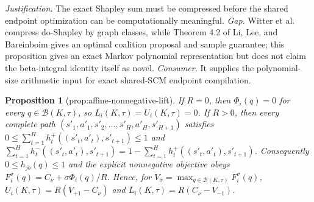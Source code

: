 \documentclass{article}
\newtheorem{proposition}{Proposition}
\begin{document}
\par\smallskip\noindent \textit{Justification.} The exact Shapley sum must be compressed before the shared endpoint optimization can be computationally meaningful. \textit{Gap.} Witter et al. compress do-Shapley by graph classes, while Theorem 4.2 of Li, Lee, and Bareinboim gives an optimal coalition proposal and sample guarantee; this proposition gives an exact Markov polynomial representation but does not claim the beta-integral identity itself as novel. \textit{Consumer.} It supplies the polynomial-size arithmetic input for exact shared-SCM endpoint compilation.

\begin{proposition}[prop:affine-nonnegative-lift]\label{prop:affine-nonnegative-lift}
If \(R=0\), then \(\Phi_i(q)=0\) for every \(q\in\mathcal B(K,\tau)\), so \(L_i(K,\tau)=U_i(K,\tau)=0\). If \(R>0\), then every complete path \((s'_1,a'_1,s'_2,\ldots,s'_H,a'_H,s'_{H+1})\) satisfies \(0\le\sum_{t=1}^Hh_t^{+}((s'_t,a'_t),s'_{t+1})\le1\) and \(\sum_{t=1}^Hh_t^{-}((s'_t,a'_t),s'_{t+1})=1-\sum_{t=1}^Hh_t^{+}((s'_t,a'_t),s'_{t+1})\). Consequently \(0\le h_{jb}(q)\le1\) and the explicit nonnegative objective obeys \(F_i^{\sigma}(q)=C_{\nu}+\sigma\Phi_i(q)/R\). Hence, for \(V_{\sigma}=\max_{q\in\mathcal B(K,\tau)}F_i^{\sigma}(q)\), \(U_i(K,\tau)=R(V_{+1}-C_{\nu})\) and \(L_i(K,\tau)=R(C_{\nu}-V_{-1})\).
\end{proposition}
\end{document}
